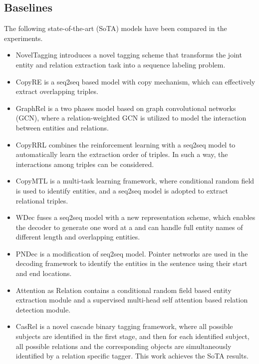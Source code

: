 \documentclass[letterpaper]{article} \usepackage{aaai21}  \usepackage{times}  \usepackage{helvet} \usepackage{courier}  \usepackage[hyphens]{url}  \usepackage{graphicx} \usepackage{amsfonts,amssymb}
\begin{document}
\subsection{Baselines}
The following state-of-the-art (SoTA) models have been compared in the experiments.
\begin{itemize}
\item NovelTagging \cite{zheng2017joint} introduces a novel tagging scheme that transforms the joint entity and relation extraction task into a sequence labeling problem.
\item CopyRE \cite{zeng2018extracting} is a seq2seq based model with copy mechanism, which can effectively extract overlapping triples.
\item GraphRel \cite{fu2019graphrel} is a two phases model based on graph convolutional networks (GCN), where a relation-weighted GCN is utilized to
model the interaction between entities and relations.
\item CopyRRL \cite{zeng2019learning} combines the reinforcement
learning with a seq2seq model to automatically learn the
extraction order of triples. In such a way, the interactions among
triples can be considered.
\item CopyMTL \cite{zeng2020copymtl} is a multi-task learning
framework, where conditional random field is used to identify entities, and
a seq2seq model is adopted to extract relational triples.
\item WDec \cite{nayak2019ptrnetdecoding} fuses a seq2seq model with a new representation scheme, which enables the decoder to generate one word at a and can handle full entity names of different length and overlapping entities. 
\item PNDec \cite{nayak2019ptrnetdecoding} is a modification of seq2seq model. Pointer networks are used in the decoding framework to identify the entities in the sentence using their start and end locations.
\item Attention as Relation \cite{ijcai2020-524} contains
a conditional random field based entity extraction module and a supervised multi-head self attention based relation detection module. 
\item CasRel \cite{wei-etal-2020-novel} is a novel cascade binary tagging
framework, where all possible subjects are identified in the first stage, and then for each identified subject, all possible relations and the corresponding objects are simultaneously identified by a relation specific tagger. This work achieves the SoTA results.
\end{itemize}
\end{document}
